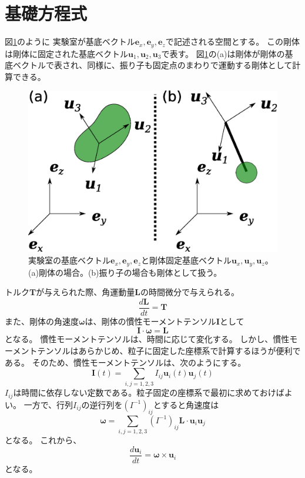 \documentclass[a4paper,11pt]{jbook}
\begin{document}
\section{基礎方程式}
図\ref{fig:3_01_system}のように
実験室が基底ベクトル$\bm{e}_x, \bm{e}_y,\bm{e}_z $で記述される空間とする。
この剛体は剛体に固定された基底ベクトル$\bm{u}_1,\bm{u}_2,\bm{u}_3$で表す。
図\ref{fig:3_01_system}の(a)は剛体が剛体の基底ベクトルで表され、同様に、振り子も固定点のまわりで運動する剛体として計算できる。
\begin{figure}[h]
\centering
  \includegraphics[clip,width=0.8\linewidth]{pict/3_01_system.eps}
  \caption{実験室の基底ベクトル$\bm{e}_x,\bm{e}_y,\bm{e}_z$と剛体固定基底ベクトル$\bm{u}_x,\bm{u}_y,\bm{u}_z$。
  (a)剛体の場合。(b)振り子の場合も剛体として扱う。
  }
  \label{fig:3_01_system}
\end{figure}

トルク$\bm{T}$が与えられた際、角運動量$\bm{L}$の時間微分で与えられる。
\begin{equation}
\frac{d\bm{L}}{dt}=\bm{T}
\label{eq:dLdt}
\end{equation}
また、剛体の角速度$\bm{\omega}$は、剛体の慣性モーメントテンソル$\bm{I}$として
\begin{equation}
\bm{I}\cdot\bm{\omega}=\bm{L}
\end{equation}
となる。
慣性モーメントテンソルは、時間に応じて変化する。
しかし、慣性モーメントテンソルはあらかじめ、粒子に固定した座標系で計算するほうが便利である。
そのため、慣性モーメントテンソルは、次のようにする。
\begin{equation}
\bm{I}(t)=\sum_{i,j=1,2,3}I_{ij}\bm{u}_i(t)\bm{u}_j(t)
\end{equation}
$I_{ij}$は時間に依存しない定数である。粒子固定の座標系で最初に求めておけばよい。
一方で、行列$I_{ij}$の逆行列を$(I^{-1})_{ij}$とすると角速度は
 \begin{equation}
 \bm{\omega}=\sum_{i,j=1,2,3}(I^{-1})_{ij}\bm{L}\cdot\bm{u}_i\bm{u}_j
 \label{eq:omega}
 \end{equation}
 となる。
 これから、
\begin{equation}
\frac{d\bm{u}_i}{dt}=\bm{\omega}\times\bm{u}_i
\label{eq:dudt}
\end{equation}
となる。
\end{document}
